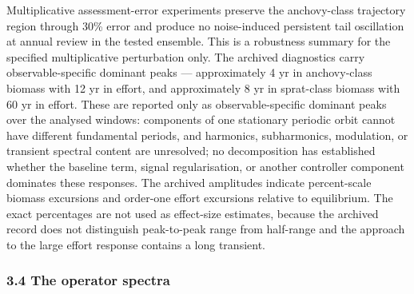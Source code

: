 \documentclass[11pt]{article}
\begin{document}
Multiplicative assessment-error experiments preserve the anchovy-class
trajectory region through 30\% error and produce no noise-induced
persistent tail oscillation at annual review in the tested ensemble.
This is a robustness summary for the specified multiplicative
perturbation only. The archived diagnostics carry observable-specific
dominant peaks --- approximately 4 yr in anchovy-class biomass with 12
yr in effort, and approximately 8 yr in sprat-class biomass with 60 yr
in effort. These are reported only as observable-specific dominant peaks
over the analysed windows: components of one stationary periodic orbit
cannot have different fundamental periods, and harmonics, subharmonics,
modulation, or transient spectral content are unresolved; no
decomposition has established whether the baseline term, signal
regularisation, or another controller component dominates these
responses. The archived amplitudes indicate percent-scale biomass
excursions and order-one effort excursions relative to equilibrium. The
exact percentages are not used as effect-size estimates, because the
archived record does not distinguish peak-to-peak range from
half-range and the approach to the large effort response contains a long
transient.

\subsubsection{3.4 The operator spectra}\label{the-operator-spectra}
\end{document}
